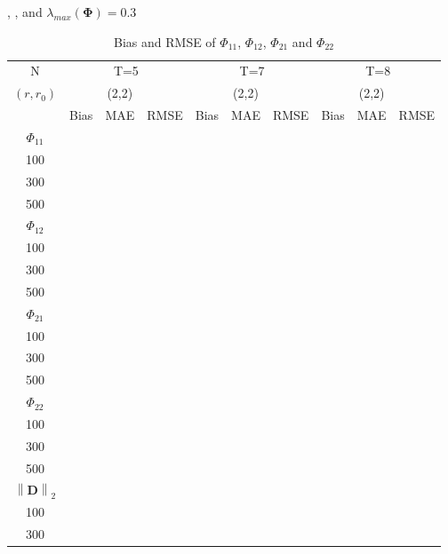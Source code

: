 \documentclass[12pt,a4paper,hyperref]{article}
\begin{document}
\begin{table}[H]
\caption{Bias and RMSE of $\Phi_{11}$, $\Phi_{12}$, $\Phi_{21}$ and $\Phi_{22}$}, , and $\lambda_{max}(\boldsymbol{\Phi})=0.3$     \label{table1}
\centering
\tabcolsep=0.11cm
\begin{threeparttable}
\begin{tabular} {*{10}{c}}
\toprule
N& \multicolumn{3}{c}{T=5}&\multicolumn{3}{c}{T=7}&\multicolumn{3}{c}{T=8}\\
\cmidrule(lr){1-10}
$(r,r_{0})$ &   &(2,2)  &  &   &(2,2)  & &  &(2,2) & \\
\cmidrule(lr){1-4} \cmidrule(lr){5-7}\cmidrule(lr){8-10}
& \multicolumn{1}{c}{Bias} &\multicolumn{1}{c}{MAE}& \multicolumn{1}{c}{RMSE}&\multicolumn{1}{c}{Bias} &\multicolumn{1}{c}{MAE}& \multicolumn{1}{c}{RMSE}&\multicolumn{1}{c}{Bias}&\multicolumn{1}{c}{MAE} & \multicolumn{1}{c}{RMSE}\\
  \cmidrule(lr){2-4} \cmidrule(lr){5-7} \cmidrule(lr){8-10}
 $\Phi_{11}$\\
\cmidrule(lr){1-10}
 100&  & & &	  &	& & & &   \\
300&   &  & &	  &	&	& & &  \\
500& &  &   &	  &	& & & &	  \\
\cmidrule(lr){1-10}
$\Phi_{12}$\\
\cmidrule(lr){1-4}   \cmidrule(lr){5-7}   \cmidrule(lr){8-10}
  100&  & & &	  &	& & & &   \\
300&   &  & &	  &	&	& & &  \\
500& &  &   &	  &	& & & &	  \\
\cmidrule(lr){1-10}
$\Phi_{21}$\\
\cmidrule(lr){1-4}   \cmidrule(lr){5-7}   \cmidrule(lr){8-10}
 100&  & & &	  &	& & & &   \\
300&   &  & &	  &	&	& & &  \\
500& &  &   &	  &	& & & &	  \\
\cmidrule(lr){1-10}
$\Phi_{22}$\\
\cmidrule(lr){1-4}   \cmidrule(lr){5-7}   \cmidrule(lr){8-10}
 100&  & & &	  &	& & & &   \\
300&   &  & &	  &	&	& & &  \\
500& &  &   &	  &	& & & &	  \\
\cmidrule(lr){1-10}
$\left\| \boldsymbol{D} \right\|_{2} $\\
\cmidrule(lr){1-4}   \cmidrule(lr){5-7}   \cmidrule(lr){8-10}
100&  & & &	  &	& & & &   \\
300&   &  & &	  &	&	& & &  \\

\end{tabular}
\end{threeparttable}
\end{table}
\end{document}
